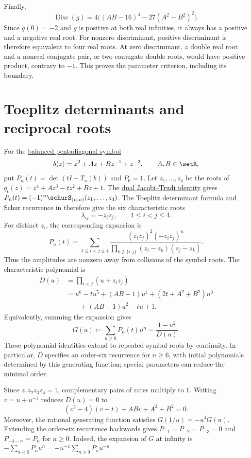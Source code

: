 \begin{proof*}
Finally,
\[
 \operatorname{Disc}(g)=4\bigl((AB-16)^3-27(A^2-B^2)^2\bigr).
\]
Since $g(0)=-2$ and $g$ is positive at both real infinities, it always
has a positive and a negative real root. For nonzero discriminant,
positive discriminant is therefore equivalent to four real roots.
At zero discriminant, a double real root and a nonreal conjugate pair,
or two conjugate double roots, would have positive product, contrary to $-1$.
This proves the parameter criterion, including its boundary.
\end{proof*}

\section[toeplitzReciprocalRecurrence]{Toeplitz determinants and reciprocal roots}

For the \hyperref[toeplitzPentadiagonal]{balanced pentadiagonal symbol}
\[
 b(z)=z^2+Az+Bz^{-1}+z^{-2},\qquad A,B\in\setR,
\]
put $P_n(t)=\det(tI-T_n(b))$ and $P_0=1$.
Let $z_1,\dotsc,z_4$ be the roots of
$q_t(z)=z^4+Az^3-tz^2+Bz+1$.
The \hyperref[schurJacobiTrudi]{dual Jacobi--Trudi identity} gives
$P_n(t)=(-1)^n\schurS_{(n,n)}(z_1,\dotsc,z_4)$.
The Toeplitz determinant formula and Schur recurrence in
\cite{Alexandersson2012Toeplitz} therefore give the six characteristic roots
\[
 \lambda_{ij}=-z_i z_j,\qquad 1\leq i<j\leq4.
\]
For distinct $z_i$, the corresponding expansion is
\[
 P_n(t)=\sum_{1\leq i<j\leq4}
 \frac{(z_i z_j)^2(-z_i z_j)^n}
 {\prod_{k\notin\{i,j\}}(z_i-z_k)(z_j-z_k)}.
\]
Thus the amplitudes are nonzero away from collisions of the symbol roots.
The characteristic polynomial is
\begin{align*}
 D(u)&=\prod_{i<j}(u+z_i z_j)\\
 &=u^6-tu^5+(AB-1)u^4+(2t+A^2+B^2)u^3\\
 &\qquad +(AB-1)u^2-tu+1.
\end{align*}
Equivalently, summing the expansion gives
\[
 G(u)\coloneqq\sum_{n\geq0}P_n(t)u^n=\frac{1-u^2}{D(u)}.
\]
These polynomial identities extend to repeated symbol roots by continuity.
In particular, $D$ specifies an order-six recurrence for $n\geq6$,
with initial polynomials determined by this generating function;
special parameters can reduce the minimal order.

Since $z_1z_2z_3z_4=1$, complementary pairs of rates multiply to $1$.
Writing $v=u+u^{-1}$ reduces $D(u)=0$ to
\[
 (v^2-4)(v-t)+ABv+A^2+B^2=0.
\]
Moreover, the rational generating function satisfies $G(1/u)=-u^4G(u)$.
Extending the order-six recurrence backwards gives
$P_{-1}=P_{-2}=P_{-3}=0$ and $P_{-4-n}=P_n$ for $n\geq0$.
Indeed, the expansion of $G$ at infinity is
$-\sum_{n<0}P_nu^n=-u^{-4}\sum_{n\geq0}P_nu^{-n}$.

